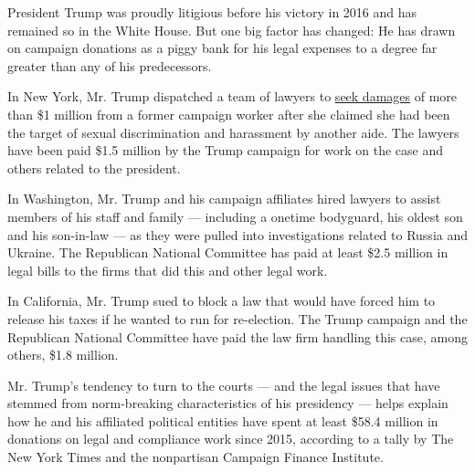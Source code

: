 President Trump was proudly litigious before his victory in 2016 and has
remained so in the White House. But one big factor has changed: He has
drawn on campaign donations as a piggy bank for his legal expenses to a
degree far greater than any of his predecessors.

In New York, Mr. Trump dispatched a team of lawyers to
\href{https://int.graylady3jvrrxbe.onion/data/documenttools/101616-2017-jessica-denson-v-jessica-denson-exhibit-s-17-arbitration-files/b5ecf44c5ac0c015/full.pdf}{seek
damages} of more than \$1 million from a former campaign worker after
she claimed she had been the target of sexual discrimination and
harassment by another aide. The lawyers have been paid \$1.5 million by
the Trump campaign for work on the case and others related to the
president.

In Washington, Mr. Trump and his campaign affiliates hired lawyers to
assist members of his staff and family --- including a onetime
bodyguard, his oldest son and his son-in-law --- as they were pulled
into investigations related to Russia and Ukraine. The Republican
National Committee has paid at least \$2.5 million in legal bills to the
firms that did this and other legal work.

In California, Mr. Trump sued to block a law that would have forced him
to release his taxes if he wanted to run for re-election. The Trump
campaign and the Republican National Committee have paid the law firm
handling this case, among others, \$1.8 million.

Mr. Trump's tendency to turn to the courts --- and the legal issues that
have stemmed from norm-breaking characteristics of his presidency ---
helps explain how he and his affiliated political entities have spent at
least \$58.4 million in donations on legal and compliance work since
2015, according to a tally by The New York Times and the nonpartisan
Campaign Finance Institute.

